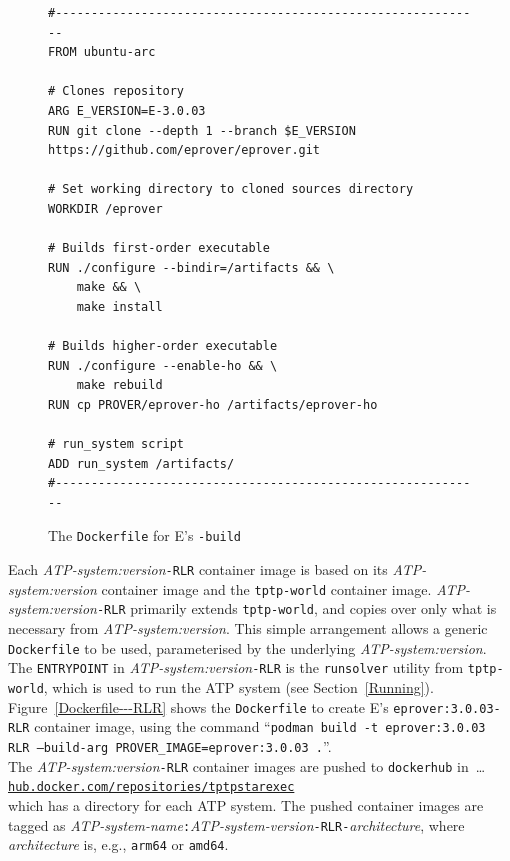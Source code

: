 \documentclass{easychair}
\begin{document}
\begin{figure}[htb]
{\small
\begin{verbatim}
#------------------------------------------------------------
FROM ubuntu-arc

# Clones repository
ARG E_VERSION=E-3.0.03
RUN git clone --depth 1 --branch $E_VERSION https://github.com/eprover/eprover.git

# Set working directory to cloned sources directory
WORKDIR /eprover

# Builds first-order executable
RUN ./configure --bindir=/artifacts && \
    make && \
    make install

# Builds higher-order executable
RUN ./configure --enable-ho && \
    make rebuild
RUN cp PROVER/eprover-ho /artifacts/eprover-ho

# run_system script
ADD run_system /artifacts/
#------------------------------------------------------------
\end{verbatim}
}
\caption{The {\tt Dockerfile} for E's {\tt -build}}
\label{E---build}
\end{figure}

Each {\em ATP-system:version}{\tt -RLR} container image is based on its
{\em ATP-system:version} container image and the {\tt tptp-world} container image.
{\em ATP-system:version}{\tt -RLR} primarily extends {\tt tptp-world}, and
copies over only what is necessary from {\em ATP-system:version}.
This simple arrangement allows a generic {\tt Dockerfile} to be used, parameterised by the
underlying {\em ATP-system:version}.
The {\tt ENTRYPOINT} in {\em ATP-system:version}{\tt -RLR} is the {\tt runsolver} utility from
{\tt tptp-world}, which is used to run the ATP system (see Section~\ref{Running}).
Figure~\ref{Dockerfile---RLR} shows the {\tt Dockerfile} to create E's {\tt eprover:3.0.03-RLR} 
container image, using the command 
``{\tt podman~build -t~eprover:3.0.03 RLR~--build-arg PROVER\_IMAGE=eprover:3.0.03~.}''. \\
The {\em ATP-system:version}{\tt -RLR} container images are pushed to {\tt dockerhub} in~\ldots\\
\hspace*{1cm}\href{https://hub.docker.com/repositories/tptpstarexec}{\tt hub.docker.com/repositories/tptpstarexec}\\
which has a directory for each ATP system.
The pushed container images are tagged as 
{\em ATP-system-name}{\tt :}{\em ATP-system-version}{\tt -RLR-}{\em architecture},
where {\em architecture} is, e.g., {\tt arm64} or {\tt amd64}.
\end{document}
